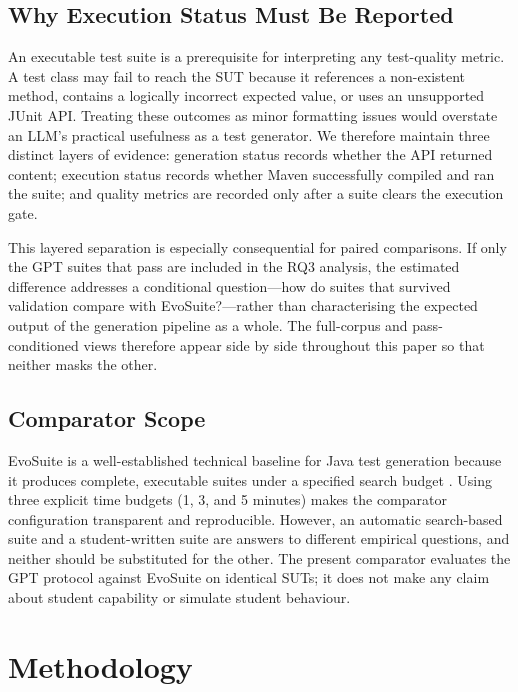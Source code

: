 ﻿\documentclass[conference]{IEEEtran}
\begin{document}
\subsection{Why Execution Status Must Be Reported}

An executable test suite is a prerequisite for interpreting any test-quality metric. A test class may fail to reach the SUT because it references a non-existent method, contains a logically incorrect expected value, or uses an unsupported JUnit API. Treating these outcomes as minor formatting issues would overstate an LLM's practical usefulness as a test generator. We therefore maintain three distinct layers of evidence: generation status records whether the API returned content; execution status records whether Maven successfully compiled and ran the suite; and quality metrics are recorded only after a suite clears the execution gate.

This layered separation is especially consequential for paired comparisons. If only the GPT suites that pass are included in the RQ3 analysis, the estimated difference addresses a conditional question---how do suites that survived validation compare with EvoSuite?---rather than characterising the expected output of the generation pipeline as a whole. The full-corpus and pass-conditioned views therefore appear side by side throughout this paper so that neither masks the other.

\subsection{Comparator Scope}

EvoSuite is a well-established technical baseline for Java test generation because it produces complete, executable suites under a specified search budget \cite{fraser2011evosuite}. Using three explicit time budgets (1, 3, and 5 minutes) makes the comparator configuration transparent and reproducible. However, an automatic search-based suite and a student-written suite are answers to different empirical questions, and neither should be substituted for the other. The present comparator evaluates the GPT protocol against EvoSuite on identical SUTs; it does not make any claim about student capability or simulate student behaviour.

\section{Methodology}
\label{sec:method}
\end{document}
